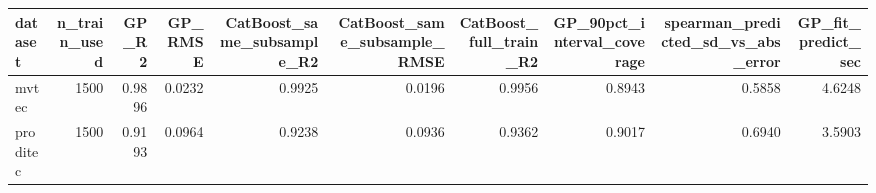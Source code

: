 \begin{tabular}{lrrrrrrrrr}
\toprule
 dataset &  n\_train\_used &  GP\_R2 &  GP\_RMSE &  CatBoost\_same\_subsample\_R2 &  CatBoost\_same\_subsample\_RMSE &  CatBoost\_full\_train\_R2 &  GP\_90pct\_interval\_coverage &  spearman\_predicted\_sd\_vs\_abs\_error &  GP\_fit\_predict\_sec \\
\midrule
   mvtec &          1500 & 0.9896 &   0.0232 &                      0.9925 &                        0.0196 &                  0.9956 &                      0.8943 &                              0.5858 &              4.6248 \\
proditec &          1500 & 0.9193 &   0.0964 &                      0.9238 &                        0.0936 &                  0.9362 &                      0.9017 &                              0.6940 &              3.5903 \\
\bottomrule
\end{tabular}
